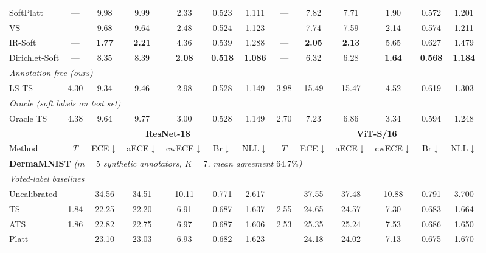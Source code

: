 \documentclass[10pt,journal,compsoc]{IEEEtran}
\begin{document}
\begin{table}[t]
{\begin{tabular}{l cccccc cccccc}
    SoftPlatt      & ---  &  9.98 &  9.99 &  2.33 & 0.523 & 1.111  & ---  &  7.82 &  7.71 &  1.90 & 0.572 & 1.201 \\
    VS             & ---  &  9.68 &  9.64 &  2.48 & 0.524 & 1.123  & ---  &  7.74 &  7.59 &  2.14 & 0.574 & 1.211 \\
    IR-Soft        & ---  &  \textbf{1.77} & \textbf{2.21} &  4.36 & 0.539 & 1.288  & ---  &  \textbf{2.05} & \textbf{2.13} &  5.65 & 0.627 & 1.479 \\
    Dirichlet-Soft & ---  &  8.35 &  8.39 &  \textbf{2.08} & \textbf{0.518} & \textbf{1.086}  & ---  &  6.32 &  6.28 &  \textbf{1.64} & \textbf{0.568} & \textbf{1.184} \\
    \cmidrule(l){1-13}
    \multicolumn{13}{l}{\textit{Annotation-free (ours)}} \\
    LS-TS          & 4.30 &  9.34 &  9.46 &  2.98 & 0.528 & 1.149  & 3.98 & 15.49 & 15.47 &  4.52 & 0.619 & 1.303 \\
    \cmidrule(l){1-13}
    \multicolumn{13}{l}{\textit{Oracle (soft labels on test set)}} \\
    Oracle TS      & 4.38 &  9.64 &  9.77 &  3.00 & 0.528 & 1.149  & 2.70 &  7.23 &  6.86 &  3.34 & 0.594 & 1.248 \\
    \midrule
    & \multicolumn{6}{c}{\textbf{ResNet-18}} & \multicolumn{6}{c}{\textbf{ViT-S/16}} \\
    \cmidrule(lr){2-7} \cmidrule(lr){8-13}
    Method & $T$ & ECE$\downarrow$ & aECE$\downarrow$ & cwECE$\downarrow$ & Br$\downarrow$ & NLL$\downarrow$
           & $T$ & ECE$\downarrow$ & aECE$\downarrow$ & cwECE$\downarrow$ & Br$\downarrow$ & NLL$\downarrow$ \\
    \midrule
    \multicolumn{13}{l}{\textbf{DermaMNIST} \textit{($m{=}5$ synthetic annotators, $K{=}7$, mean agreement $64.7\%$)}} \\
    \midrule
    \multicolumn{13}{l}{\textit{Voted-label baselines}} \\
    Uncalibrated   & ---  & 34.56 & 34.51 & 10.11 & 0.771 & 2.617  & ---  & 37.55 & 37.48 & 10.88 & 0.791 & 3.700 \\
    TS             & 1.84 & 22.25 & 22.20 &  6.91 & 0.687 & 1.637  & 2.55 & 24.65 & 24.57 &  7.30 & 0.683 & 1.664 \\
    ATS            & 1.86 & 22.82 & 22.75 &  6.97 & 0.687 & 1.606  & 2.53 & 25.35 & 25.24 &  7.53 & 0.686 & 1.650 \\
    Platt          & ---  & 23.10 & 23.03 &  6.93 & 0.682 & 1.623  & ---  & 24.18 & 24.02 &  7.13 & 0.675 & 1.670 \\

\end{tabular}}
\end{table}
\end{document}
